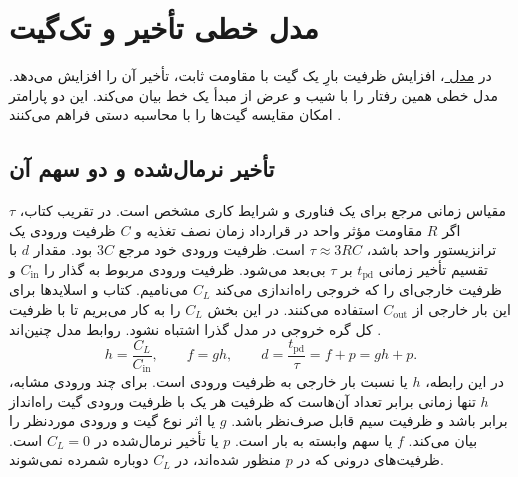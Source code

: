 \section{مدل خطی تأخیر و  تک‌گیت}
\label{sec:delay-linear-model}

در \hyperref[sec:delay-rc-model]{مدل }، افزایش ظرفیت بارِ
یک گیت با مقاومت ثابت، تأخیر آن را افزایش می‌دهد. مدل خطی همین
رفتار را با شیب و عرض از مبدأ یک خط بیان می‌کند. این دو پارامتر
امکان مقایسه گیت‌ها را با محاسبه دستی فراهم می‌کنند
\cite[بخش ، صفحه ۱۵۵]{weste}
\cite[اسلایدهای ۳ تا ۵]{logicaleffortslides}.

\subsection{تأخیر نرمال‌شده و دو سهم آن}
\label{sec:delay-stage-effort}

\(\tau\) مقیاس زمانی مرجع برای یک فناوری و شرایط کاری مشخص است.
در تقریب  کتاب، اگر \(R\) مقاومت مؤثر 
واحد در قرارداد زمان نصف تغذیه و \(C\) ظرفیت ورودی یک ترانزیستور
واحد باشد، \(\tau\approx3RC\) است. ظرفیت ورودی خود
 مرجع \(3C\) بود. مقدار \(d\) با تقسیم تأخیر
زمانی \(t_{\mathrm{pd}}\) بر \(\tau\) بی‌بعد می‌شود. ظرفیت
ورودی مربوط به گذار را \(C_{\mathrm{in}}\) و ظرفیت خارجی‌ای
را که خروجی راه‌اندازی می‌کند \(C_L\) می‌نامیم.
کتاب و اسلایدها برای این بار خارجی از \(C_{\mathrm{out}}\)
استفاده می‌کنند. در این بخش \(C_L\) را به کار می‌بریم تا با
ظرفیت کل گره خروجی در مدل گذرا اشتباه نشود. روابط مدل چنین‌اند
\cite[روابط  تا ، صفحه ۱۵۵]{weste}
\cite[اسلاید ۴]{logicaleffortslides}.
\begin{equation}
  h=\frac{C_L}{C_{\mathrm{in}}},\qquad
  f=gh,\qquad
  d=\frac{t_{\mathrm{pd}}}{\tau}=f+p=gh+p.
  \label{eq:delay-normalized-gate}
\end{equation}
در این رابطه، \(h\) یا  نسبت بار خارجی
به ظرفیت ورودی است. برای چند ورودی مشابه، \(h\) تنها زمانی برابر
تعداد آن‌هاست که ظرفیت هر یک با ظرفیت ورودی گیت راه‌انداز برابر
باشد و ظرفیت سیم قابل صرف‌نظر باشد. \(g\) یا 
اثر نوع گیت و ورودی موردنظر را بیان می‌کند. \(f\) یا
 سهم وابسته به بار است. \(p\) یا
 تأخیر نرمال‌شده در \(C_L=0\) است.
ظرفیت‌های درونی که در \(p\) منظور شده‌اند، در \(C_L\) دوباره
شمرده نمی‌شوند.

